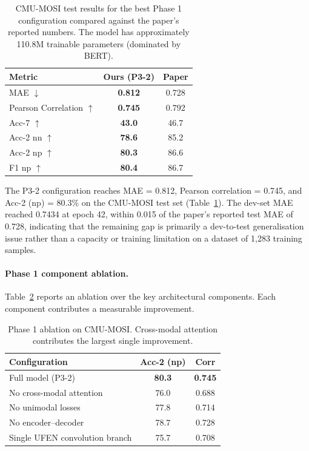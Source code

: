 \documentclass[11pt,twocolumn]{article}
\begin{document}
\begin{table}[h]
\centering
\small
\begin{tabular}{lcc}
\toprule
\textbf{Metric} & \textbf{Ours (P3-2)} & \textbf{Paper} \\
\midrule
MAE $\downarrow$           & \textbf{0.812} & 0.728 \\
Pearson Correlation $\uparrow$ & \textbf{0.745} & 0.792 \\
Acc-7 $\uparrow$           & \textbf{43.0}  & 46.7 \\
Acc-2 nn $\uparrow$        & \textbf{78.6}  & 85.2 \\
Acc-2 np $\uparrow$        & \textbf{80.3}  & 86.6 \\
F1 np $\uparrow$           & \textbf{80.4}  & 86.7 \\
\bottomrule
\end{tabular}
\caption{CMU-MOSI test results for the best Phase 1 configuration compared against the paper's reported numbers. The model has approximately 110.8M trainable parameters (dominated by BERT).}
\label{tab:mosi_results}
\end{table}

The P3-2 configuration reaches MAE = 0.812, Pearson correlation = 0.745, and Acc-2 (np) = 80.3\% on the CMU-MOSI test set (Table~\ref{tab:mosi_results}). The dev-set MAE reached 0.7434 at epoch 42, within 0.015 of the paper's reported test MAE of 0.728, indicating that the remaining gap is primarily a dev-to-test generalisation issue rather than a capacity or training limitation on a dataset of 1{,}283 training samples.

\paragraph{Phase 1 component ablation.} Table~\ref{tab:mosi_ablation} reports an ablation over the key architectural components. Each component contributes a measurable improvement.

\begin{table}[h]
\centering
\small
\begin{tabular}{lcc}
\toprule
\textbf{Configuration} & \textbf{Acc-2 (np)} & \textbf{Corr} \\
\midrule
Full model (P3-2)                   & \textbf{80.3} & \textbf{0.745} \\
No cross-modal attention            & 76.0          & 0.688 \\
No unimodal losses                  & 77.8          & 0.714 \\
No encoder--decoder                  & 78.7          & 0.728 \\
Single UFEN convolution branch      & 75.7          & 0.708 \\
\bottomrule
\end{tabular}
\caption{Phase 1 ablation on CMU-MOSI. Cross-modal attention contributes the largest single improvement.}
\label{tab:mosi_ablation}
\end{table}
\end{document}
